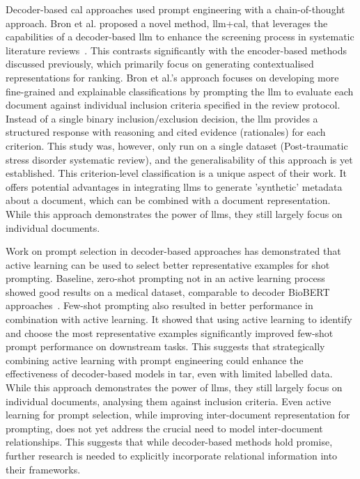 \documentclass[10pt,oneside]{book}
\begin{document}
Decoder-based \gls*{cal} approaches used prompt engineering with a chain-of-thought approach. Bron et al. proposed a novel method, \gls*{llm}+\gls*{cal}, that leverages the capabilities of a decoder-based \gls*{llm} to enhance the screening process in systematic literature reviews~\cite{bron_combining_2024}. This contrasts significantly with the encoder-based methods discussed previously, which primarily focus on generating contextualised representations for ranking. Bron et al.'s approach focuses on developing more fine-grained and explainable classifications by prompting the \gls*{llm} to evaluate each document against individual inclusion criteria specified in the review protocol. Instead of a single binary inclusion/exclusion decision, the \gls*{llm} provides a structured response with reasoning and cited evidence (rationales) for each criterion. This study was, however, only run on a single dataset (Post-traumatic stress disorder systematic review), and the generalisability of this approach is yet established. This criterion-level classification is a unique aspect of their work. It offers potential advantages in integrating \gls*{llm}s to generate 'synthetic' metadata about a document, which can be combined with a document representation. While this approach demonstrates the power of \gls*{llm}s, they still largely focus on individual documents.

Work on prompt selection in decoder-based approaches has demonstrated that active learning can be used to select better representative examples for shot prompting.  Baseline, zero-shot prompting not in an active learning process showed good results on a medical dataset, comparable to decoder BioBERT approaches~\cite{wang_zero-shot_2024}. Few-shot prompting also resulted in better performance \cite{margatina_importance_2022} in combination with active learning. It showed that using active learning to identify and choose the most representative examples significantly improved few-shot prompt performance on downstream tasks. This suggests that strategically combining active learning with prompt engineering could enhance the effectiveness of decoder-based models in \gls*{tar}, even with limited labelled data. While this approach demonstrates the power of \gls*{llm}s, they still largely focus on individual documents, analysing them against inclusion criteria. Even active learning for prompt selection, while improving inter-document representation for prompting, does not yet address the crucial need to model inter-document relationships.  This suggests that while decoder-based methods hold promise, further research is needed to explicitly incorporate relational information into their frameworks. 
\end{document}

